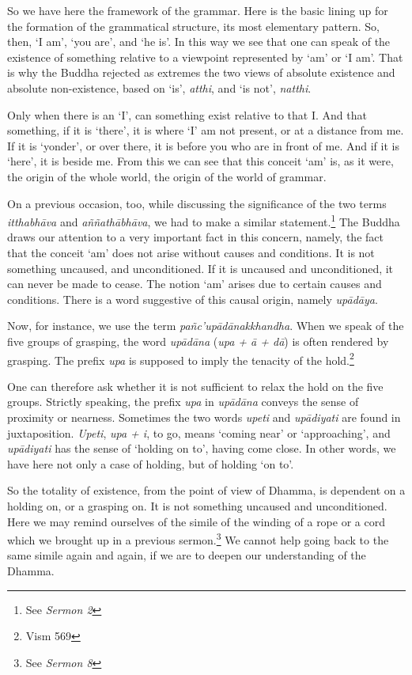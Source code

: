 So we have here the framework of the grammar. Here is the basic lining up for the formation of the grammatical structure, its most elementary pattern. So, then, `I am', `you are', and `he is'. In this way we see that one can speak of the existence of something relative to a viewpoint represented by `am' or `I am'. That is why the Buddha rejected as extremes the two views of absolute existence and absolute non-existence, based on `is', \emph{atthi}, and `is not', \emph{natthi}.

Only when there is an `I', can something exist relative to that I. And that something, if it is `there', it is where `I' am not present, or at a distance from me. If it is `yonder', or over there, it is before you who are in front of me. And if it is `here', it is beside me. From this we can see that this conceit `am' is, as it were, the origin of the whole world, the origin of the world of grammar.

On a previous occasion, too, while discussing the significance of the two terms \emph{itthabhāva} and \emph{aññathābhāva}, we had to make a similar statement.\footnote{See \emph{Sermon 2}} The Buddha draws our attention to a very important fact in this concern, namely, the fact that the conceit `am' does not arise without causes and conditions. It is not something uncaused, and unconditioned. If it is uncaused and unconditioned, it can never be made to cease. The notion `am' arises due to certain causes and conditions. There is a word suggestive of this causal origin, namely \emph{upādāya}.

Now, for instance, we use the term \emph{pañc'upādānakkhandha}. When we speak of the five groups of grasping, the word \emph{upādāna} (\emph{upa + ā + dā}) is often rendered by grasping. The prefix \emph{upa} is supposed to imply the tenacity of the hold.\footnote{Vism 569}

One can therefore ask whether it is not sufficient to relax the hold on the five groups. Strictly speaking, the prefix \emph{upa} in \emph{upādāna} conveys the sense of proximity or nearness. Sometimes the two words \emph{upeti} and \emph{upādiyati} are found in juxtaposition. \emph{Upeti}, \emph{upa + i}, to go, means `coming near' or `approaching', and \emph{upādiyati} has the sense of `holding on to', having come close. In other words, we have here not only a case of holding, but of holding `on to'.

So the totality of existence, from the point of view of Dhamma, is dependent on a holding on, or a grasping on. It is not something uncaused and unconditioned. Here we may remind ourselves of the simile of the winding of a rope or a cord which we brought up in a previous sermon.\footnote{See \emph{Sermon 8}} We cannot help going back to the same simile again and again, if we are to deepen our understanding of the Dhamma.

